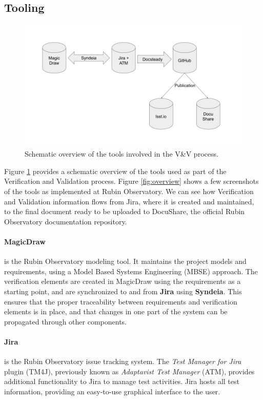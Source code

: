 \subsection{Tooling}

\begin{figure}
\begin{center}
\includegraphics[width=\textwidth]{imgs/VandVtools.png}
 \caption{Schematic overview of the tools involved in the V\&V process.}
 \label{fig:vandvtools}
\end{center}
\end{figure}

Figure \ref{fig:vandvtools} provides a schematic overview of the tools used as part of the Verification and Validation process. 
Figure \ref{fig:overview}  shows a few screenshots of the tools as implemented at  Rubin Observatory.
We can see how Verification and Validation information flows from Jira, where it is created and maintained,
to the final document ready to be uploaded to DocuShare, the official Rubin Observatory documentation repository. 


\paragraph{MagicDraw}
is the Rubin Observatory modeling tool. It maintains the project models and requirements,
using a Model Based Systems Engineering (MBSE) approach.
The verification elements are created in MagicDraw using the requirements as a starting point,
and are synchronized to and from \textbf{Jira} using \textbf{Syndeia}.
This ensures that the proper traceability between requirements and verification elements is in place,
and that changes in one part of the system can be propagated through other components.

\paragraph{Jira}
is the Rubin Observatory issue tracking system.
The \textit{Test Manager for Jira} plugin (TM4J), previously known as \textit{Adaptavist Test Manager} (ATM),
provides additional functionality to Jira to manage test activities.
Jira hosts all test information, providing an easy-to-use graphical interface to the user.

